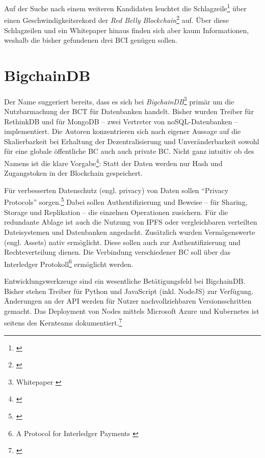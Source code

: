 Auf der Suche nach einem weiteren Kandidaten leuchtet die Schlagzeile\footnote{\autocite{w:rebealley:sydney}} über einen Geschwindigkeitsrekord der \emph{Red Belly Blockchain}\footnote{\autocite{p:rbbc}} auf.
Über diese Schlagzeilen und ein Whitepaper hinaus finden sich aber kaum Informationen, weshalb die bisher gefundenen drei \gls{BCI} genügen sollen.

\section{BigchainDB}

Der Name suggeriert bereits, dass es sich bei \emph{BigchainDB}\footnote{Whitepaper \autocite{p:bigchaindb}} primär um die Nutzbarmachung der \gls{BCT} für Datenbanken handelt.
Bisher wurden Treiber für RethinkDB und für MongoDB -- zwei Vertreter von noSQL-Datenbanken -- implementiert. Die Autoren konzentrieren sich nach eigener Aussage auf die Skalierbarkeit bei Erhaltung der Dezentralisierung und Unveränderbarkeit sowohl für eine globale öffentliche \gls{BC} auch auch private \gls{BC}.
Nicht ganz intuitiv ob des Namens ist die klare Vorgabe\footnote{\autocite{w:bcdb:features}}: Statt der Daten werden nur Hash und Zugangstoken in der Blockchain gespeichert.

Für verbesserten Datenschutz (engl. privacy) von Daten sollen \enquote{Privacy Protocols} sorgen.\footnote{\cite{w:github-bigchaindb-pp}}
Dabei sollen Authentifizierung und Beweise -- für \ua{} Sharing, Storage und Replikation -- die einzelnen Operationen zusichern.
Für die redundante Ablage ist auch die Nutzung von \gls{IPFS} oder vergleichbaren verteilten Dateisystemen und Datenbanken angedacht.
Zusätzlich wurden Vermögenswerte (engl. Assets) nativ ermöglicht.
Diese sollen auch zur Authentifizierung und Rechteverteilung dienen.
Die Verbindung verschiedener \gls{BC} soll \zB{} über das Interledger Protokoll\footnote{A Protocol for Interledger Payments \autocite{p:interledger}}\label{first:interledger} ermöglicht werden.

Entwicklungswerkzeuge sind ein wesentliche Betätigungsfeld bei BigchainDB.
Bisher stehen Treiber für Python und JavaScript (inkl. NodeJS) zur Verfügung.
Änderungen an der API werden für Nutzer nachvollziehbaren Versionsschritten gemacht.
Das Deployment von Nodes mittels Microsoft Azure und Kubernetes ist seitens des Kernteams dokumentiert.\footnote{\cite{w:bigchaindb-proddepl}}

